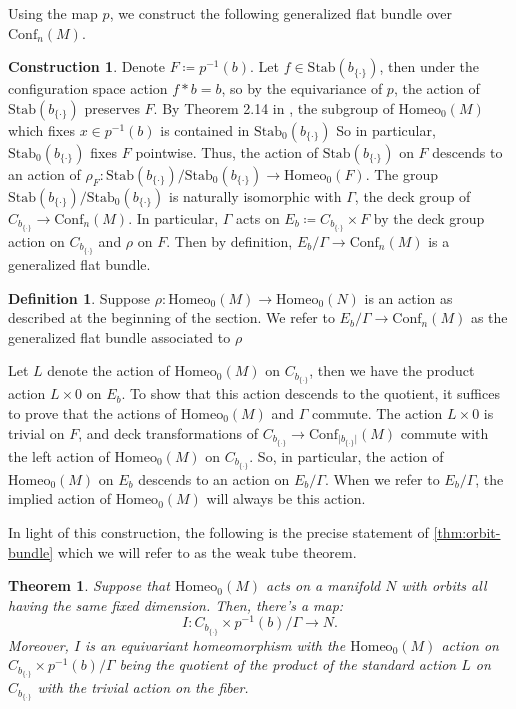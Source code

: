 \documentclass[10pt, oneside]{article}
\newcommand{\homeo}[1][S^1]{\text{Homeo}_0(#1)}
\newcommand{\conf}[2][S^1]{\text{Conf}_{#2}(#1)}
\newcommand{\set}{{\{\cdot\}}}
\newcommand{\stab}[1]{\text{Stab}(#1)}
\newcommand{\pstab}[1]{\text{Stab}_0(#1)}
\newcommand{\maxcov}{C_{b_\set}}
\newtheorem{thm}{Theorem}[section]
\theoremstyle{definition}
\newtheorem{defn}{Definition}[section]
\newtheorem*{construction*}{Construction}
\theoremstyle{definition}
\begin{document}
Using the map $p$, we construct the following generalized flat bundle over $\conf[M]{n}$.

\begin{construction*}\label{const:orbit-bundle}
    Denote $F\coloneqq p^{-1}(b)$.
    Let $f\in\stab{b_\set}$, then under the configuration space action $f*b=b$, so by the equivariance of $p$, the action of $\stab{b_\set}$ preserves $F$.
    By Theorem 2.14 in \cite{chen:StructureTheorems}, the subgroup of $\homeo[M]$ which fixes $x\in p^{-1}(b)$ is contained in $\pstab{b_\set}$
    So in particular, $\pstab{b_\set}$ fixes $F$ pointwise.
    Thus, the action of $\stab{b_\set}$ on $F$ descends to an action of $\rho_F:\stab{b_\set}/\pstab{b_\set}\to \homeo[F]$. The group $\stab{b_\set}/\pstab{b_\set}$ is naturally isomorphic with $\Gamma$, the deck group of $C_{b_\set}\to \conf[M]{n}$.
    In particular, $\Gamma$ acts on $E_b \coloneqq\maxcov\times F$ by the deck group action on $\maxcov$ and $\rho$ on $F$.
    Then by definition, $E_b/\Gamma\to\conf[M]{n}$ is a generalized flat bundle.

    \begin{defn}
        Suppose $\rho:\homeo[M]\to\homeo[N]$ is an action as described at the beginning of the section. We refer to $E_b/\Gamma\to\conf[M]{n}$ as the generalized flat bundle associated to $\rho$
    \end{defn}

    Let $L$ denote the action of $\homeo[M]$ on $\maxcov$, then we have the product action $L\times 0$ on $E_b$. To show that this action descends to the quotient, it suffices to prove that the actions of $\homeo[M]$ and $\Gamma$ commute. The action $L\times 0$ is trivial on $F$, and deck transformations of $\maxcov\to \conf[M]{\lvert b_{\set}\rvert}$ commute with the left action of $\homeo[M]$ on $\maxcov$. So, in particular, the action of $\homeo[M]$ on $E_b$ descends to an action on $E_b/\Gamma$. When we refer to $E_b/\Gamma$, the implied action of $\homeo[M]$ will always be this action.
\end{construction*}

In light of this construction, the following is the precise statement of \cref{thm:orbit-bundle} which we will refer to as the weak tube theorem.

\begin{thm}\label{thm:precise-orbit-bundle}
    Suppose that $\homeo[M]$ acts on a manifold $N$ with orbits all having the same fixed dimension.
    Then, there's a map: $$I: \maxcov \times p^{-1}(b)/ \Gamma \to N.$$
    Moreover, $I$ is an equivariant homeomorphism
    with the $\homeo[M]$ action on $\maxcov \times p^{-1}(b) / \Gamma$ being the quotient of the product of the standard action $L$ on $\maxcov$
    with the trivial action on the fiber.
\end{thm}
\end{document}
